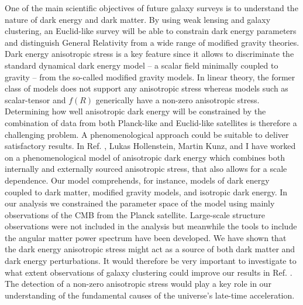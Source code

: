 One of the main scientific objectives of future galaxy surveys is to understand the nature of dark energy and dark matter. By using weak lensing and galaxy clustering, an Euclid-like survey will be able to constrain dark energy parameters and distinguish General Relativity from a wide range of modified gravity theories. Dark energy anisotropic stress is a key feature since it allows to discriminate the standard dynamical dark energy model -- a scalar field minimally coupled to gravity -- from the so-called modified gravity models. In linear theory, the former class of models does not support any anisotropic stress whereas models such as scalar-tensor and $f(R)$ generically have a non-zero anisotropic stress. Determining how well anisotropic dark energy will be constrained by the combination of data from both Planck-like and Euclid-like satellites is therefore a challenging problem. A phenomenological approach could be suitable to deliver satisfactory results. In Ref. \cite{Cardona:2014iba}, Lukas Hollenstein, Martin Kunz, and I have worked on a phenomenological model of anisotropic dark energy which combines both internally and externally sourced anisotropic stress, that also allows for a scale dependence. Our model comprehends, for instance, models of dark energy coupled to dark matter, modified gravity models, and isotropic dark energy. In our analysis we constrained the parameter space of the model using mainly observations of the CMB from the Planck satellite. Large-scale structure observations  were not included in the analysis but meanwhile the tools to include the angular matter power spectrum have been developed. We have shown that the dark energy anisotropic stress might act as a source of both dark matter and dark energy perturbations. It would therefore be very important to investigate to what extent observations of galaxy clustering could improve our results in Ref. \cite{Cardona:2014iba}. The detection of a non-zero anisotropic stress would play a key role in our understanding of the fundamental causes of the universe's late-time acceleration. 
